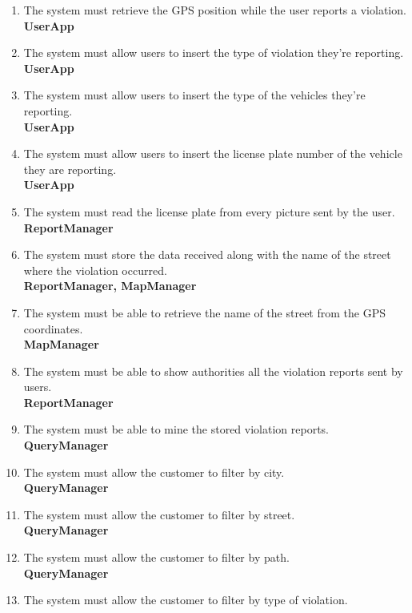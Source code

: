 \begin{enumerate}[label=\textbf{R\arabic*}]
		\item \label{req:gpsPosition} The system must retrieve the GPS position while the user reports a violation.\\
		\textbf{UserApp}
		\item \label{req:violationType} The system must allow users to insert the type of violation they’re reporting.\\
		\textbf{UserApp}
		\item \label{req:vehicleType} The system must allow users to insert the type of the vehicles they’re reporting.\\
		\textbf{UserApp}
		\item \label{req:plateNumber} The system must allow users to insert the license plate number of the vehicle they are reporting.\\
		\textbf{UserApp}
		\item \label{req:readPlate} The system must read the license plate from every picture sent by the user.\\
		\textbf{ReportManager}
		\item \label{req:storeViolation} The system must store the data received along with the name of the street where the violation occurred.\\
		\textbf{ReportManager, MapManager}
		\item \label{req:streetName} The system must be able to retrieve the name of the street from the GPS coordinates.\\
		\textbf{MapManager}
		\item \label{req:notifyAuthority} The system must be able to show authorities all the violation reports sent by users.\\
		\textbf{ReportManager}
		\item \label{req:mineData} The system must be able to mine the stored violation reports.\\
		\textbf{QueryManager}
		\item \label{req:cityFilter} The system must allow the customer to filter by city.\\
		\textbf{QueryManager}
		\item \label{req:streetFilter} The system must allow the customer to filter by street.\\
		\textbf{QueryManager}
		\item \label{req:pathFilter} The system must allow the customer to filter by path.\\
		\textbf{QueryManager}
		\item \label{req:violationFilter} The system must allow the customer to filter by type of violation.\\

\end{enumerate}
